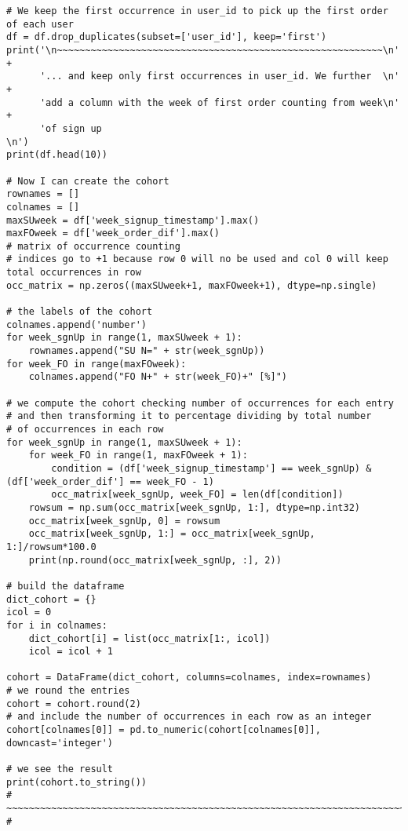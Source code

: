 \documentclass[12pt,aps,prd,amsmath,amssymb,floatfix,nofootinbib,reprint]{article}
\begin{document}
\begin{lstlisting}
# We keep the first occurrence in user_id to pick up the first order of each user
df = df.drop_duplicates(subset=['user_id'], keep='first')
print('\n~~~~~~~~~~~~~~~~~~~~~~~~~~~~~~~~~~~~~~~~~~~~~~~~~~~~~~~~~~\n' +
      '... and keep only first occurrences in user_id. We further  \n' +
      'add a column with the week of first order counting from week\n' +
      'of sign up                                                  \n')
print(df.head(10))

# Now I can create the cohort
rownames = []
colnames = []
maxSUweek = df['week_signup_timestamp'].max()
maxFOweek = df['week_order_dif'].max()
# matrix of occurrence counting
# indices go to +1 because row 0 will no be used and col 0 will keep total occurrences in row
occ_matrix = np.zeros((maxSUweek+1, maxFOweek+1), dtype=np.single)

# the labels of the cohort
colnames.append('number')
for week_sgnUp in range(1, maxSUweek + 1):
    rownames.append("SU N=" + str(week_sgnUp))
for week_FO in range(maxFOweek):
    colnames.append("FO N+" + str(week_FO)+" [%]")

# we compute the cohort checking number of occurrences for each entry
# and then transforming it to percentage dividing by total number
# of occurrences in each row
for week_sgnUp in range(1, maxSUweek + 1):
    for week_FO in range(1, maxFOweek + 1): 
        condition = (df['week_signup_timestamp'] == week_sgnUp) & (df['week_order_dif'] == week_FO - 1)
        occ_matrix[week_sgnUp, week_FO] = len(df[condition])
    rowsum = np.sum(occ_matrix[week_sgnUp, 1:], dtype=np.int32)
    occ_matrix[week_sgnUp, 0] = rowsum
    occ_matrix[week_sgnUp, 1:] = occ_matrix[week_sgnUp, 1:]/rowsum*100.0
    print(np.round(occ_matrix[week_sgnUp, :], 2))

# build the dataframe
dict_cohort = {}
icol = 0
for i in colnames:
    dict_cohort[i] = list(occ_matrix[1:, icol])
    icol = icol + 1

cohort = DataFrame(dict_cohort, columns=colnames, index=rownames)
# we round the entries
cohort = cohort.round(2)
# and include the number of occurrences in each row as an integer
cohort[colnames[0]] = pd.to_numeric(cohort[colnames[0]], downcast='integer')

# we see the result
print(cohort.to_string())
# ~~~~~~~~~~~~~~~~~~~~~~~~~~~~~~~~~~~~~~~~~~~~~~~~~~~~~~~~~~~~~~~~~~~~~~~~~~~~~~ #

\end{lstlisting}





~
\newpage


\end{document}
